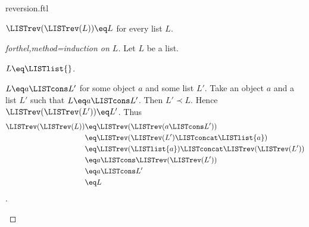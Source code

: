 \documentclass{stex}
\begin{document}
\begin{smodule}{reversion.ftl}
\begin{proposition}[forthel,id=LISTS_REV_1021563255448756]
  $\LISTrev(\LISTrev(L)) \eq L$ for every list $L$.
\end{proposition}
\begin{proof}[forthel,method=induction on $L$]
  Let $L$ be a list.

  \begin{case}{$L \eq \LISTlist{}$.}\end{case}

  \begin{case}{$L \eq a \LISTcons L'$ for some object $a$ and some list $L'$.}
    Take an object $a$ and a list $L'$ such that $L \eq a \LISTcons L'$.
    Then $L' \prec L$.
    Hence $\LISTrev(\LISTrev(L')) \eq L'$.
    Thus
    \begin{align*}
      \LISTrev(\LISTrev(L))
        &\eq \LISTrev(\LISTrev(a \LISTcons L'))\\
        &\eq \LISTrev(\LISTrev(L') \LISTconcat \LISTlist{a})\\
        &\eq \LISTrev(\LISTlist{a}) \LISTconcat \LISTrev(\LISTrev(L'))\\
        &\eq a \LISTcons \LISTrev(\LISTrev(L'))\\
        &\eq a \LISTcons L'\\
        &\eq L
    \end{align*}.
  \end{case}
\end{proof}
\end{smodule}
\end{document}
